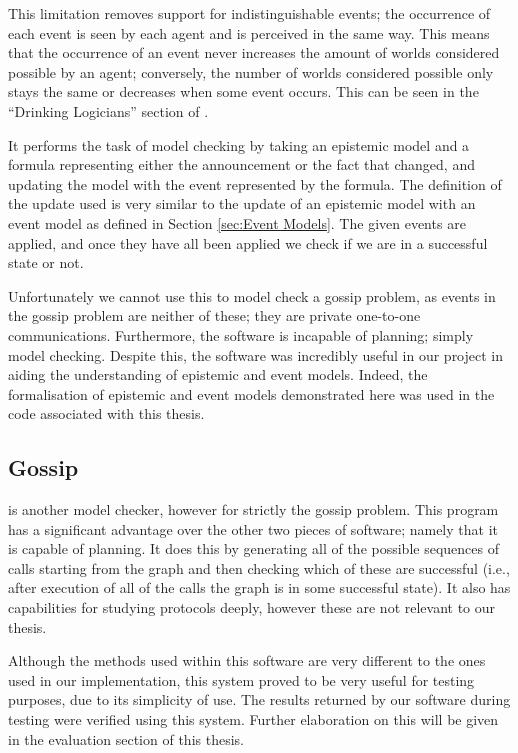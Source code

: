 \documentclass[ %
                    author={Leo Poulson},
                supervisor={Dr. Steven Ramsay},
                    degree={BSc},
                     title={Epistemic Planning for the Dynamic Gossip problem},
                  subtitle={},
                      year={2019} ]{dissertation}
\begin{document}
This limitation removes support for indistinguishable events; the occurrence of
each event is seen by each agent and is perceived in the same way. This means
that the occurrence of an event never increases the amount of worlds considered
possible by an agent; conversely, the number of worlds considered possible only
stays the same or decreases when some event occurs. This can be seen in the
``Drinking Logicians'' section of \cite{DEMO-S5}.

It performs the task of model checking by taking an epistemic model and a
formula representing either the announcement or the fact that changed, and
updating the model with the event represented by the formula. The definition of
the update used is very similar to the update of an epistemic model with an
event model as defined in Section \ref{sec:Event Models}. The given events are
applied, and once they have all been applied we check if we are in a successful
state or not.

Unfortunately we cannot use this to model check a gossip problem, as events in
the gossip problem are neither of these; they are private one-to-one
communications. Furthermore, the software is incapable of planning; simply model
checking. Despite this, the software was incredibly useful in our project in
aiding the understanding of epistemic and event models. Indeed, the
formalisation of epistemic and event models demonstrated here was used in the
code associated with this thesis.

\subsection{Gossip}

\cite{GithubGossip} is another model checker, however for strictly the gossip
problem. This program has a significant advantage over the other two pieces of
software; namely that it is capable of planning. It does this by generating all
of the possible sequences of calls starting from the graph and then checking
which of these are successful (i.e., after execution of all of the calls the
graph is in some successful state). It also has capabilities for studying
protocols deeply, however these are not relevant to our thesis.

Although the methods used within this software are very different to the ones
used in our implementation, this system proved to be very useful for testing
purposes, due to its simplicity of use. The results returned by our software
during testing were verified using this system. Further elaboration on this will
be given in the evaluation section of this thesis.
\end{document}
